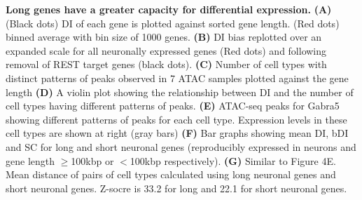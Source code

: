 \textbf{Long genes have a greater capacity for differential expression.}
\textbf{(A)} (Black dots) DI of each gene is plotted against sorted gene length. (Red dots) binned average with bin size of 1000 genes.
\textbf{(B)} DI bias replotted over an expanded scale for all neuronally expressed genes (Red dots) and following removal of REST target genes (black dots).
\textbf{(C)} Number of cell types with distinct patterns of peaks observed in 7 ATAC samples plotted against the gene length
\textbf{(D)} A violin plot showing the relationship between DI and the number of cell types having different patterns of peaks. 
\textbf{(E)} ATAC-seq peaks for Gabra5 showing different patterns of peaks for each cell type. Expression levels in these cell types are shown at right (gray bars)
\textbf{(F)} Bar graphs showing mean DI, bDI and SC for long and short neuronal genes (reproducibly expressed in neurons and gene length $\geq$100kbp or $<$100kbp respectively). 
\textbf{(G)} Similar to Figure 4E. Mean distance of pairs of cell types calculated using long neuronal genes and short neuronal genes. Z-socre is 33.2 for long and 22.1 for short neuronal genes. 
